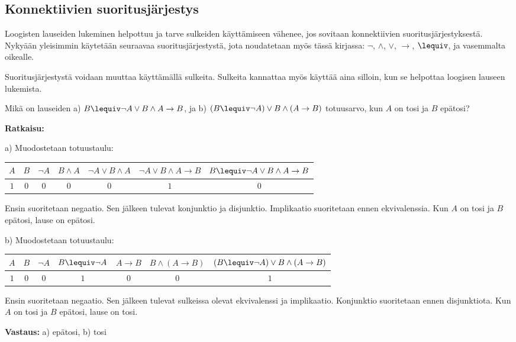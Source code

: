 \bigskip

\subsection*{Konnektiivien suoritusjärjestys} 
Loogisten lauseiden lukeminen helpottuu ja tarve sulkeiden käyttämiseen vähenee, jos sovitaan konnektiivien suoritusjärjestyksestä. Nykyään yleisimmin käytetään seuraavaa suoritusjärjestystä, jota noudatetaan myös tässä kirjassa: $\lnot$, $\land$, $\lor$, $\to$, $\lequiv$, ja vasemmalta oikealle.

Suoritusjärjestystä voidaan muuttaa käyttämällä sulkeita. Sulkeita kannattaa myös käyttää aina silloin, kun se helpottaa loogisen lauseen lukemista.

\begin{esimerkki}
Mikä on lauseiden a) $B \lequiv \lnot A\lor B \land A \to B$, ja  b)  $(B\lequiv \lnot A)\lor B \land (A\to B)$  totuusarvo, kun $A$ on tosi ja $B$ epätosi?   

{\bf Ratkaisu:}


a) Muodostetaan totuustaulu:

\begin{center}
\begin{tabular}{|c|c|c|c|c|c|c|}\hline
$A$ & $B$ & $\lnot A$ & $B \land A $ & $\lnot A\lor B \land A$ & $\lnot A\lor B \land A \to B$ & $B \lequiv \lnot A\lor B \land A \to B$\\ \hline
$1$ & $0$ & $0$ & $0$ & $0$ & $1$ & $0$\\ \hline
\end{tabular}
\end{center}

Ensin suoritetaan negaatio. Sen jälkeen tulevat konjunktio ja disjunktio. Implikaatio 	suoritetaan ennen ekvivalenssia. 	Kun $A$ on tosi ja $B$ epätosi, lause on epätosi.


b) Muodostetaan totuustaulu:

\begin{center}
\begin{tabular}{|c|c|c|c|c|c|c|}\hline
$A$ & $B$ & $\lnot A$ & $B\lequiv \lnot A$ & $A\to B$ & $B \land (A\to B)$ &  $(B\lequiv \lnot A)\lor B \land (A\to B)$\\ \hline
$1$ & $0$ & $0$ & $1$ & $0$ & $0$ & $1$\\ \hline
\end{tabular}
\end{center}

Ensin suoritetaan negaatio. Sen jälkeen tulevat sulkeissa olevat ekvivalenssi ja implikaatio. Konjunktio suoritetaan ennen disjunktiota. Kun $A$ on tosi ja $B$ epätosi, lause on tosi.

{\bf Vastaus:} a) epätosi, b) tosi
\end{esimerkki}

